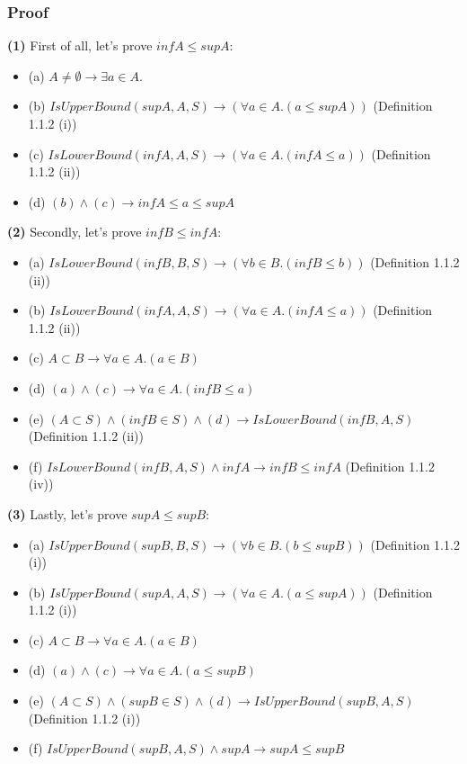 \documentclass[12pt, letterpaper, oneside]{book}
\begin{document}
\subsubsection{Proof}

\textbf{(1)} First of all, let's prove $inf A \le sup A$:
\begin{itemize}
  \item (a) $A \ne \emptyset \rightarrow \exists a \in A$.
  \item (b) $IsUpperBound(sup A, A, S) \rightarrow (\forall a \in A. (a \le sup A))$ (Definition 1.1.2 (i))
  \item (c) $IsLowerBound(inf A, A, S) \rightarrow (\forall a \in A. (inf A \le a))$ (Definition 1.1.2 (ii))
  \item (d) $(b) \land (c) \rightarrow inf A \le a \le sup A$
\end{itemize}

\textbf{(2)} Secondly, let's prove $inf B \le inf A$:
\begin{itemize}
  \item (a) $IsLowerBound(inf B, B, S) \rightarrow (\forall b \in B. (inf B \le b))$ (Definition 1.1.2 (ii))
  \item (b) $IsLowerBound(inf A, A, S) \rightarrow (\forall a \in A. (inf A \le a))$ (Definition 1.1.2 (ii))
  \item (c) $A \subset B \rightarrow \forall a \in A. (a \in B)$
  \item (d) $(a) \land (c) \rightarrow \forall a \in A. (inf B \le a)$
  \item (e) $(A \subset S) \land (inf B \in S) \land (d) \rightarrow IsLowerBound(inf B, A, S)$ (Definition 1.1.2 (ii))
  \item (f) $IsLowerBound(inf B, A, S) \land inf A \rightarrow inf B \le inf A$ (Definition 1.1.2 (iv))
\end{itemize}

\textbf{(3)} Lastly, let's prove $sup A \le sup B$:
\begin{itemize}
  \item (a) $IsUpperBound(sup B, B, S) \rightarrow (\forall b \in B. (b \le sup B))$ (Definition 1.1.2 (i))
  \item (b) $IsUpperBound(sup A, A, S) \rightarrow (\forall a \in A. (a \le sup A))$ (Definition 1.1.2 (i))
  \item (c) $A \subset B \rightarrow \forall a \in A. (a \in B)$
  \item (d) $(a) \land (c) \rightarrow \forall a \in A. (a \le sup B)$
  \item (e) $(A \subset S) \land (sup B \in S) \land (d) \rightarrow IsUpperBound(sup B, A, S)$ (Definition 1.1.2 (i))
  \item (f) $IsUpperBound(sup B, A, S) \land sup A \rightarrow sup A \le sup B$
\end{itemize}
\end{document}
